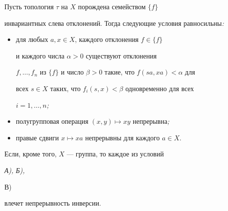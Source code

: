 \begin{thm} Пусть топология $\tau$ на $X$ порождена семейством $\{f\}$ 


инвариантных слева отклонений. Тогда следующие условия равносильны{\em :}


\begin{itemize} 


\item[А)] для любых $a,x\in X$, каждого отклонения $f\in\{f\}$ 


и каждого числа $\alpha>0$ существуют отклонения 


$f,\dotsc,f_n$ из $\{f\}$ и число $\beta>0$ такие, что $f(sa,xa)<\alpha$ для 


всех $s\in X$ таких, что $f_i(s,x)<\beta$ одновременно для всех 


$i=1,\dotsc,n${\em ;}


\item[Б)] полугрупповая операция $(x,y)\mapsto xy$ непрерывна{\em ;}


\item[В)] правые сдвиги $x\mapsto xa$ непрерывны для каждого $a\in X$. 


\end{itemize} 


 


Если, кроме того, $X$ --- группа, то каждое из условий {\em А), Б), 


В)} влечет непрерывность инверсии. 


\end{thm} 


 


